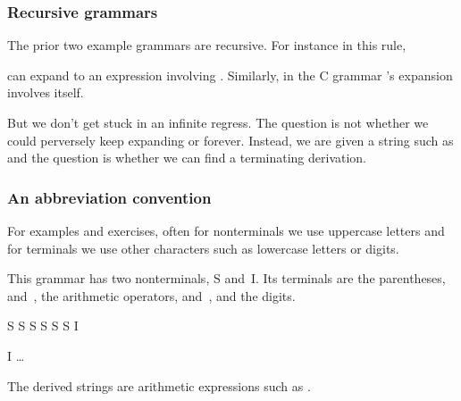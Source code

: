\documentclass[9pt,t,serif,professionalfont,xcolor={table,dvipsnames},noamsthm]{beamer}
\begin{document}
\begin{frame}
  \frametitle{Recursive grammars}

The prior two example grammars are recursive. 
For instance in this rule,
\begin{grammar}
 \produces {} 
  \syntaxor {}
\end{grammar}
 can expand to
an expression involving .
Similarly, in the C grammar 's expansion 
involves itself.
\begin{grammar}
	\produces{} 
	\syntaxor {} 
\end{grammar}
But we don't get stuck in an infinite regress. 
The question is not whether we could perversely 
keep expanding  or  forever.
Instead, we are given a string such as  and the question is 
whether we can find a terminating derivation.
\end{frame}


\begin{frame}
  \frametitle{An abbreviation convention}

For examples and exercises, often for nonterminals we use uppercase letters
and for terminals we use other characters 
such as lowercase letters or digits.

\begin{example}
This grammar has two nonterminals, S and~I.
Its terminals are the parentheses, \trm{(} and~\trm{)},
the arithmetic operators, \trm{+} and~\trm{*}, 
and the digits.
\begin{grammar}
S \produces \trm{(} S \trm{)} \syntaxor S \trm{+} S \syntaxor S \trm{*} S \syntaxor I

I \produces{}  \syntaxor {} \syntaxor \ldots{} 
\end{grammar}
The derived strings are arithmetic expressions
such as .
\end{example}
\end{frame}
\end{document}
